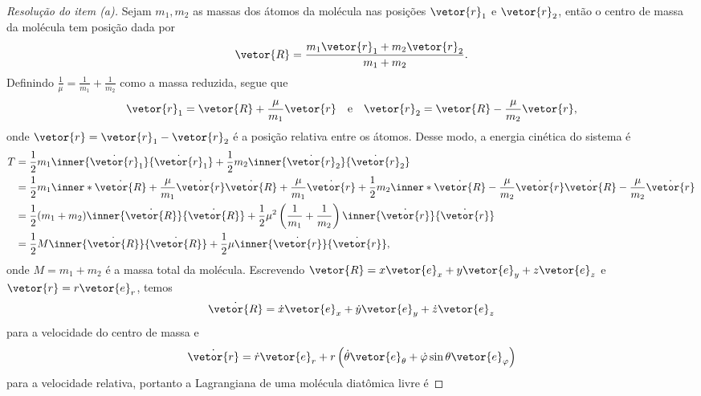 \begin{proof}[Resolução do item (a)]
    Sejam \(m_1, m_2\) as massas dos átomos da molécula nas posições \(\vetor{r}_1\) e \(\vetor{r}_2\), então o centro de massa da molécula tem posição dada por
    \begin{equation*}
        \vetor{R} = \frac{m_1 \vetor{r}_1 + m_2 \vetor{r}_2}{m_1 + m_2}.
    \end{equation*}
    Definindo \(\frac1\mu = \frac{1}{m_1} + \frac{1}{m_2}\) como a massa reduzida, segue que
    \begin{equation*}
        \vetor{r}_1 = \vetor{R} + \frac{\mu}{m_1}\vetor{r}
        \quad\text{e}\quad
        \vetor{r}_2 = \vetor{R} - \frac{\mu}{m_2}\vetor{r},
    \end{equation*}
    onde \(\vetor{r} = \vetor{r}_1 - \vetor{r}_2\) é a posição relativa entre os átomos. Desse modo, a energia cinética do sistema é
    \begin{align*}
        T &= \frac12m_1\inner{\dot{\vetor{r}}_1}{\dot{\vetor{r}}_1} + \frac12 m_2 \inner{\dot{\vetor{r}}_2}{\dot{\vetor{r}}_2}\\
          &= \frac12 m_1 \inner*{\dot{\vetor{R}} + \frac{\mu}{m_1}\dot{\vetor{r}}}{\dot{\vetor{R}} + \frac{\mu}{m_1}\dot{\vetor{r}}} + \frac12 m_2 \inner*{\dot{\vetor{R}} - \frac{\mu}{m_2}\dot{\vetor{r}}}{\dot{\vetor{R}} - \frac{\mu}{m_2}\dot{\vetor{r}}}\\
          &= \frac12 (m_1 + m_2) \inner{\dot{\vetor{R}}}{\dot{\vetor{R}}} + \frac12 \mu^2\left(\frac{1}{m_1} + \frac{1}{m_2}\right) \inner{\dot{\vetor{r}}}{\dot{\vetor{r}}}\\
          &= \frac12 M\inner{\dot{\vetor{R}}}{\dot{\vetor{R}}} + \frac12 \mu \inner{\dot{\vetor{r}}}{\dot{\vetor{r}}},
    \end{align*}
    onde \(M = m_1 + m_2\) é a massa total da molécula. Escrevendo \(\vetor{R} = x\vetor{e}_x + y\vetor{e}_y + z\vetor{e}_z\) e \(\vetor{r} = r\vetor{e}_r\), temos
    \begin{equation*}
        \dot{\vetor{R}} = \dot{x}\vetor{e}_x + \dot{y}\vetor{e}_y + \dot{z} \vetor{e}_z
    \end{equation*}
    para a velocidade do centro de massa e
    \begin{equation*}
        \dot{\vetor{r}} = \dot{r}\vetor{e}_r + r\left(\dot{\theta}\vetor{e}_\theta + \dot{\varphi}\sin\theta \vetor{e}_\varphi\right)
    \end{equation*}
    para a velocidade relativa, portanto a Lagrangiana de uma molécula diatômica livre é

\end{proof}
